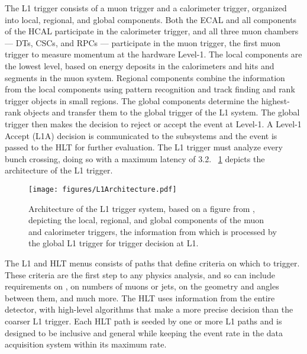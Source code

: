 The L1 trigger consists of a muon trigger and a calorimeter trigger, organized into local, regional, and global components.
Both the ECAL and all components of the HCAL participate in the calorimeter trigger, and all three muon chambers --- DTs, CSCs, and RPCs --- participate in the muon trigger, the first muon trigger to measure momentum at the hardware Level-1.
The local components are the lowest level, based on energy deposits in the calorimeters and hits and segments in the muon system.
Regional components combine the information from the local components using pattern recognition and track finding and rank trigger objects in small regions.
The global components determine the highest-rank objects and transfer them to the global trigger of the L1 system.
The global trigger then makes the decision to reject or accept the event at Level-1.
A Level-1 Accept (L1A) decision is communicated to the subsystems and the event is passed to the HLT for further evaluation.
The L1 trigger must analyze every bunch crossing, doing so with a maximum latency of 3.2\mus.
\Fig~\ref{cms:L1} depicts the architecture of the L1 trigger.

\begin{figure}[tb]
  \centering
  \texttt{[image: figures/L1Architecture.pdf]}
  \caption{Architecture of the L1 trigger system, based on a figure from \cite{Chatrchyan:2008zzk}, depicting the local, regional, and global components of the muon and calorimeter triggers, the information from which is processed by the global L1 trigger for trigger decision at L1.}
  \label{cms:L1}
\end{figure}

\pagebreak
The L1 and HLT menus consists of paths that define criteria on which to trigger.
These criteria are the first step to any physics analysis, and so can include requirements on \pT, on numbers of muons or jets, on the geometry and angles between them, and much more.
The HLT uses information from the entire detector, with high-level algorithms that make a more precise decision than the coarser L1 trigger.
Each HLT path is seeded by one or more L1 paths and is designed to be inclusive and general while keeping the event rate in the data acquisition system within its maximum rate.
